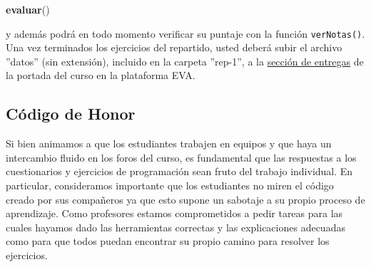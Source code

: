\documentclass[]{article}
\newenvironment{Shaded}{}{}
\newcommand{\KeywordTok}[1]{\textcolor[rgb]{0.00,0.44,0.13}{\textbf{{#1}}}}
\newcommand{\NormalTok}[1]{{#1}}
\begin{document}
\begin{Shaded}
\begin{Highlighting}[]
\KeywordTok{evaluar}\NormalTok{()}
\end{Highlighting}
\end{Shaded}
y además podrá en todo momento verificar su puntaje con la función
\texttt{verNotas()}. Una vez terminados los ejercicios del repartido,
usted deberá subir el archivo ''datos'' (sin extensión), incluido en la
carpeta ''rep-1'', a la
\href{http://eva.universidad.edu.uy/mod/assignment/view.php?id=93616}{sección
de entregas} de la portada del curso en la plataforma EVA.

\subsection{Código de Honor}

Si bien animamos a que los estudiantes trabajen en equipos y que haya un
intercambio fluido en los foros del curso, es fundamental que las
respuestas a los cuestionarios y ejercicios de programación sean fruto
del trabajo individual. En particular, consideramos importante que los
estudiantes no miren el código creado por sus compañeros ya que esto
supone un sabotaje a su propio proceso de aprendizaje. Como profesores
estamos comprometidos a pedir tareas para las cuales hayamos dado las
herramientas correctas y las explicaciones adecuadas como para que todos
puedan encontrar su propio camino para resolver los ejercicios.
\end{document}
